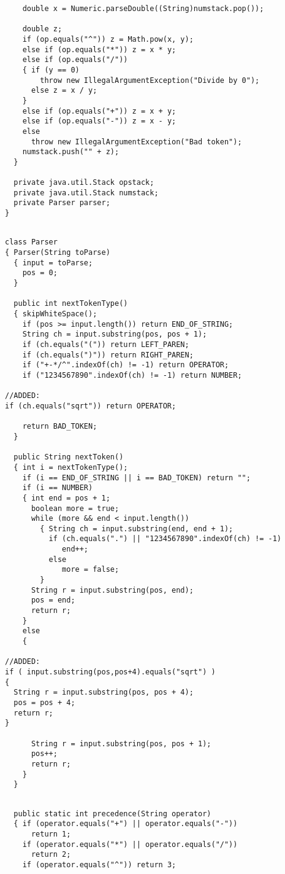 \begin{enumerate}
\begin{enumerate}
\begin{verbatim}
    double x = Numeric.parseDouble((String)numstack.pop());

    double z;
    if (op.equals("^")) z = Math.pow(x, y);
    else if (op.equals("*")) z = x * y;
    else if (op.equals("/"))
    { if (y == 0)
        throw new IllegalArgumentException("Divide by 0");
      else z = x / y;
    }
    else if (op.equals("+")) z = x + y;
    else if (op.equals("-")) z = x - y;
    else
      throw new IllegalArgumentException("Bad token");
    numstack.push("" + z);
  }

  private java.util.Stack opstack;
  private java.util.Stack numstack;
  private Parser parser;
}
\end{verbatim}

\begin{verbatim}

class Parser
{ Parser(String toParse)
  { input = toParse;
    pos = 0;
  }

  public int nextTokenType()
  { skipWhiteSpace();
    if (pos >= input.length()) return END_OF_STRING;
    String ch = input.substring(pos, pos + 1);
    if (ch.equals("(")) return LEFT_PAREN;
    if (ch.equals(")")) return RIGHT_PAREN;
    if ("+-*/^".indexOf(ch) != -1) return OPERATOR;
    if ("1234567890".indexOf(ch) != -1) return NUMBER;
    
//ADDED:
if (ch.equals("sqrt")) return OPERATOR;
    
    return BAD_TOKEN;
  }

  public String nextToken()
  { int i = nextTokenType();
    if (i == END_OF_STRING || i == BAD_TOKEN) return "";
    if (i == NUMBER)
    { int end = pos + 1;
      boolean more = true;
      while (more && end < input.length())
        { String ch = input.substring(end, end + 1);
          if (ch.equals(".") || "1234567890".indexOf(ch) != -1)
             end++;
          else
             more = false;
        }
      String r = input.substring(pos, end);
      pos = end;
      return r;
    }
    else
    { 

//ADDED:
if ( input.substring(pos,pos+4).equals("sqrt") )
{
  String r = input.substring(pos, pos + 4);
  pos = pos + 4;
  return r;
}

      String r = input.substring(pos, pos + 1);
      pos++;
      return r;
    }
  }
\end{verbatim}

\begin{verbatim}
   
  public static int precedence(String operator)
  { if (operator.equals("+") || operator.equals("-")) 
      return 1;
    if (operator.equals("*") || operator.equals("/")) 
      return 2;
    if (operator.equals("^")) return 3;
    

\end{verbatim}
\end{enumerate}
\end{enumerate}
